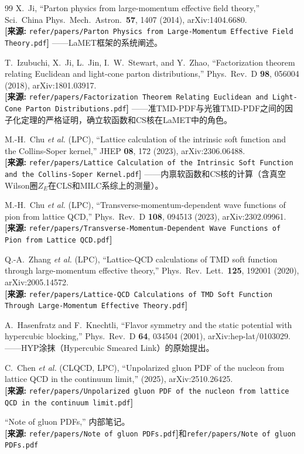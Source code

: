 \documentclass[12pt,a4paper]{ctexart}
\theoremstyle{definition}
\begin{document}
\begin{thebibliography}{99}
X.~Ji,
``Parton physics from large-momentum effective field theory,''
Sci.\ China Phys.\ Mech.\ Astron.\ \textbf{57}, 1407 (2014), arXiv:1404.6680.
\\\textbf{[来源:} \texttt{refer/papers/Parton Physics from Large-Momentum Effective Field Theory.pdf}\textbf{]}
——LaMET框架的系统阐述。

T.~Izubuchi, X.~Ji, L.~Jin, I.~W.~Stewart, and Y.~Zhao,
``Factorization theorem relating Euclidean and light-cone parton distributions,''
Phys.\ Rev.\ D \textbf{98}, 056004 (2018), arXiv:1801.03917.
\\\textbf{[来源:} \texttt{refer/papers/Factorization Theorem Relating Euclidean and Light-Cone Parton Distributions.pdf}\textbf{]}
——准TMD-PDF与光锥TMD-PDF之间的因子化定理的严格证明，确立软函数和CS核在LaMET中的角色。

M.-H.~Chu \textit{et al.} (LPC),
``Lattice calculation of the intrinsic soft function and the Collins-Soper kernel,''
JHEP \textbf{08}, 172 (2023), arXiv:2306.06488.
\\\textbf{[来源:} \texttt{refer/papers/Lattice Calculation of the Intrinsic Soft Function and the Collins-Soper Kernel.pdf}\textbf{]}
——内禀软函数和CS核的计算（含真空Wilson圈$Z_E$在CLS和MILC系综上的测量）。

M.-H.~Chu \textit{et al.} (LPC),
``Transverse-momentum-dependent wave functions of pion from lattice QCD,''
Phys.\ Rev.\ D \textbf{108}, 094513 (2023), arXiv:2302.09961.
\\\textbf{[来源:} \texttt{refer/papers/Transverse-Momentum-Dependent Wave Functions of Pion from Lattice QCD.pdf}\textbf{]}

Q.-A.~Zhang \textit{et al.} (LPC),
``Lattice-QCD calculations of TMD soft function through large-momentum effective theory,''
Phys.\ Rev.\ Lett.\ \textbf{125}, 192001 (2020), arXiv:2005.14572.
\\\textbf{[来源:} \texttt{refer/papers/Lattice-QCD Calculations of TMD Soft Function Through Large-Momentum Effective Theory.pdf}\textbf{]}

A.~Hasenfratz and F.~Knechtli,
``Flavor symmetry and the static potential with hypercubic blocking,''
Phys.\ Rev.\ D \textbf{64}, 034504 (2001), arXiv:hep-lat/0103029.
——HYP涂抹（Hypercubic Smeared Link）的原始提出。

C.~Chen \textit{et al.} (CLQCD, LPC),
``Unpolarized gluon PDF of the nucleon from lattice QCD in the continuum limit,''
(2025), arXiv:2510.26425.
\\\textbf{[来源:} \texttt{refer/papers/Unpolarized gluon PDF of the nucleon from lattice QCD in the continuum limit.pdf}\textbf{]}

``Note of gluon PDFs,'' 内部笔记。
\\\textbf{[来源:} \texttt{refer/papers/Note of gluon PDFs.pdf}\textbf{]}和\texttt{refer/papers/Note of gluon PDFs.pdf}

\end{thebibliography}
\end{document}

